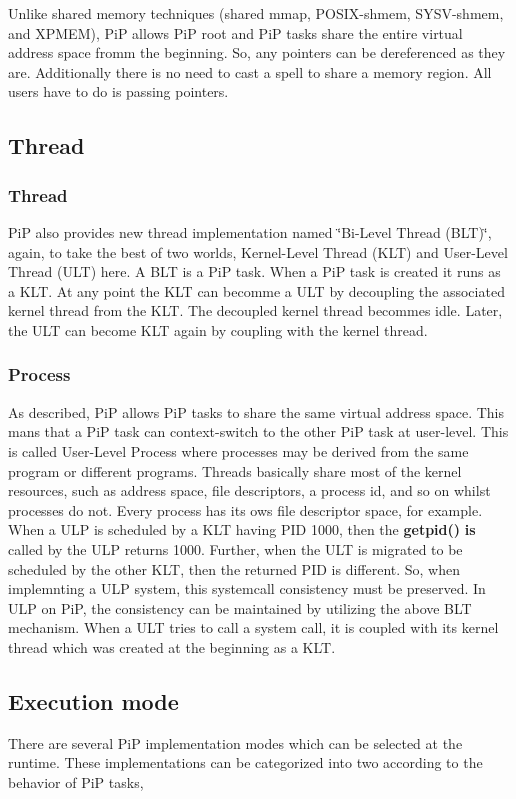 Unlike shared memory techniques (shared mmap, P\-O\-S\-I\-X-\/shmem, S\-Y\-S\-V-\/shmem, and X\-P\-M\-E\-M), Pi\-P allows Pi\-P root and Pi\-P tasks share the entire virtual address space fromm the beginning. So, any pointers can be dereferenced as they are. Additionally there is no need to cast a spell to share a memory region. All users have to do is passing pointers.\hypertarget{group__pip-overview_Bi-Level}{}\subsection{Thread}\label{group__pip-overview_Bi-Level}
\hypertarget{group__pip-overview_Bi-Level}{}\subsubsection{Thread}\label{group__pip-overview_Bi-Level}
Pi\-P also provides new thread implementation named \char`\"{}\-Bi-\/\-Level Thread
(\-B\-L\-T)\char`\"{}, again, to take the best of two worlds, Kernel-\/\-Level Thread (K\-L\-T) and User-\/\-Level Thread (U\-L\-T) here. A B\-L\-T is a Pi\-P task. When a Pi\-P task is created it runs as a K\-L\-T. At any point the K\-L\-T can becomme a U\-L\-T by decoupling the associated kernel thread from the K\-L\-T. The decoupled kernel thread becommes idle. Later, the U\-L\-T can become K\-L\-T again by coupling with the kernel thread.\hypertarget{group__pip-overview_User-Level}{}\subsubsection{Process}\label{group__pip-overview_User-Level}
As described, Pi\-P allows Pi\-P tasks to share the same virtual address space. This mans that a Pi\-P task can context-\/switch to the other Pi\-P task at user-\/level. This is called User-\/\-Level Process where processes may be derived from the same program or different programs. Threads basically share most of the kernel resources, such as address space, file descriptors, a process id, and so on whilst processes do not. Every process has its ows file descriptor space, for example. When a U\-L\-P is scheduled by a K\-L\-T having P\-I\-D 1000, then the {\bfseries getpid()} {\bfseries is} called by the U\-L\-P returns 1000. Further, when the U\-L\-T is migrated to be scheduled by the other K\-L\-T, then the returned P\-I\-D is different. So, when implemnting a U\-L\-P system, this systemcall consistency must be preserved. In U\-L\-P on Pi\-P, the consistency can be maintained by utilizing the above B\-L\-T mechanism. When a U\-L\-T tries to call a system call, it is coupled with its kernel thread which was created at the beginning as a K\-L\-T.\hypertarget{group__pip-overview_execution-mode}{}\subsection{Execution mode}\label{group__pip-overview_execution-mode}
There are several Pi\-P implementation modes which can be selected at the runtime. These implementations can be categorized into two according to the behavior of Pi\-P tasks,


